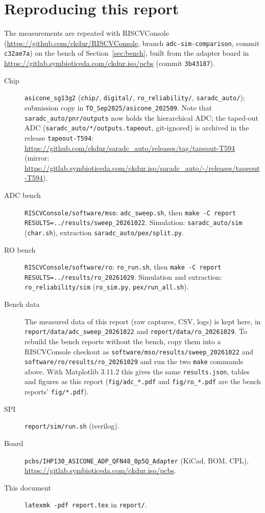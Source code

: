\documentclass[10pt,a4paper]{article}
\begin{document}
\section{Reproducing this report}
\label{sec:repro}
The measurements are repeated with RISCVConsole (\url{https://github.com/ckdur/RISCVConsole}, branch
\texttt{adc-sim-comparison}, commit \texttt{c32ae7a}) on the bench of Section~\ref{sec:bench}, built from
the adapter board in \url{https://gitlab.symbioticeda.com/ckdur.iso/pcbs} (commit \texttt{3b43187}).
\begin{description}
  \item[Chip] \texttt{asicone\_sg13g2} (\texttt{chip/}, \texttt{digital/}, \texttt{ro\_reliability/},
        \texttt{saradc\_auto/}); submission copy in \nolinkurl{TO_Sep2025/asicone_202509}. Note that
        \nolinkurl{saradc_auto/pnr/outputs} now holds the hierarchical ADC; the taped-out ADC
        (\nolinkurl{saradc_auto/*/outputs.tapeout}, git-ignored) is archived in the release
        \texttt{tapeout-T594}: \url{https://github.com/ckdur/saradc_auto/releases/tag/tapeout-T594}
        (mirror: \url{https://gitlab.symbioticeda.com/ckdur.iso/saradc_auto/-/releases/tapeout-T594}).
  \item[ADC bench] \nolinkurl{RISCVConsole/software/mso}: \texttt{adc\_sweep.sh}, then\newline
        \texttt{make -C report RESULTS=../results/sweep\_20261022}. \newline Simulation:
        \texttt{saradc\_auto/sim} (\texttt{char.sh}), extraction \nolinkurl{saradc_auto/pex/split.py}.
  \item[RO bench] \nolinkurl{RISCVConsole/software/ro}: \texttt{ro\_run.sh}, then\newline
        \texttt{make -C report RESULTS=../results/ro\_20261029}. \newline Simulation and extraction:
        \nolinkurl{ro_reliability/sim} (\texttt{ro\_sim.py}, \texttt{pex/run\_all.sh}).
  \item[Bench data] The measured data of this report (raw captures, CSV, logs) is kept here, in
        \nolinkurl{report/data/adc_sweep_20261022} and \nolinkurl{report/data/ro_20261029}. To rebuild
        the bench reports without the bench, copy them into a RISCVConsole checkout as
        \nolinkurl{software/mso/results/sweep_20261022} and \nolinkurl{software/ro/results/ro_20261029}
        and run the two \texttt{make} commands above. With Matplotlib 3.11.2 this gives the same
        \texttt{results.json}, tables and figures as this report (\nolinkurl{fig/adc_*.pdf} and
        \nolinkurl{fig/ro_*.pdf} are the bench reports' \nolinkurl{fig/*.pdf}).
  \item[SPI] \texttt{report/sim/run.sh} (iverilog).
  \item[Board] \nolinkurl{pcbs/IHP130_ASICONE_ADP_QFN48_0p5Q_Adapter} (KiCad, BOM, CPL),
        \url{https://gitlab.symbioticeda.com/ckdur.iso/pcbs}.
  \item[This document] \texttt{latexmk -pdf report.tex} in \texttt{report/}.
\end{description}
\end{document}
